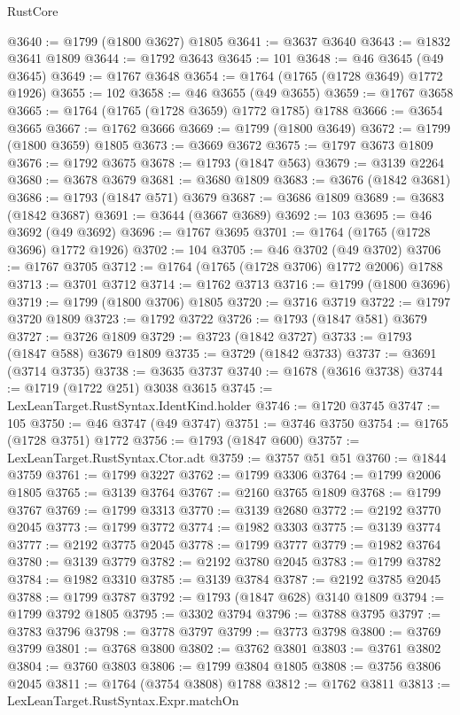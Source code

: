 \begin{lexlean}{RustCore}
\begin{coremodule}
@3640 := @1799 (@1800 @3627) @1805
@3641 := @3637 @3640
@3643 := @1832 @3641 @1809
@3644 := @1792 @3643
@3645 := 101
@3648 := @46 @3645 (@49 @3645)
@3649 := @1767 @3648
@3654 := @1764 (@1765 (@1728 @3649) @1772 @1926)
@3655 := 102
@3658 := @46 @3655 (@49 @3655)
@3659 := @1767 @3658
@3665 := @1764 (@1765 (@1728 @3659) @1772 @1785) @1788
@3666 := @3654 @3665
@3667 := @1762 @3666
@3669 := @1799 (@1800 @3649)
@3672 := @1799 (@1800 @3659) @1805
@3673 := @3669 @3672
@3675 := @1797 @3673 @1809
@3676 := @1792 @3675
@3678 := @1793 (@1847 @563)
@3679 := @3139 @2264
@3680 := @3678 @3679
@3681 := @3680 @1809
@3683 := @3676 (@1842 @3681)
@3686 := @1793 (@1847 @571) @3679
@3687 := @3686 @1809
@3689 := @3683 (@1842 @3687)
@3691 := @3644 (@3667 @3689)
@3692 := 103
@3695 := @46 @3692 (@49 @3692)
@3696 := @1767 @3695
@3701 := @1764 (@1765 (@1728 @3696) @1772 @1926)
@3702 := 104
@3705 := @46 @3702 (@49 @3702)
@3706 := @1767 @3705
@3712 := @1764 (@1765 (@1728 @3706) @1772 @2006) @1788
@3713 := @3701 @3712
@3714 := @1762 @3713
@3716 := @1799 (@1800 @3696)
@3719 := @1799 (@1800 @3706) @1805
@3720 := @3716 @3719
@3722 := @1797 @3720 @1809
@3723 := @1792 @3722
@3726 := @1793 (@1847 @581) @3679
@3727 := @3726 @1809
@3729 := @3723 (@1842 @3727)
@3733 := @1793 (@1847 @588) @3679 @1809
@3735 := @3729 (@1842 @3733)
@3737 := @3691 (@3714 @3735)
@3738 := @3635 @3737
@3740 := @1678 (@3616 @3738)
@3744 := @1719 (@1722 @251) @3038 @3615
@3745 := LexLeanTarget.RustSyntax.IdentKind.holder
@3746 := @1720 @3745
@3747 := 105
@3750 := @46 @3747 (@49 @3747)
@3751 := @3746 @3750
@3754 := @1765 (@1728 @3751) @1772
@3756 := @1793 (@1847 @600)
@3757 := LexLeanTarget.RustSyntax.Ctor.adt
@3759 := @3757 @51 @51
@3760 := @1844 @3759
@3761 := @1799 @3227
@3762 := @1799 @3306
@3764 := @1799 @2006 @1805
@3765 := @3139 @3764
@3767 := @2160 @3765 @1809
@3768 := @1799 @3767
@3769 := @1799 @3313
@3770 := @3139 @2680
@3772 := @2192 @3770 @2045
@3773 := @1799 @3772
@3774 := @1982 @3303
@3775 := @3139 @3774
@3777 := @2192 @3775 @2045
@3778 := @1799 @3777
@3779 := @1982 @3764
@3780 := @3139 @3779
@3782 := @2192 @3780 @2045
@3783 := @1799 @3782
@3784 := @1982 @3310
@3785 := @3139 @3784
@3787 := @2192 @3785 @2045
@3788 := @1799 @3787
@3792 := @1793 (@1847 @628) @3140 @1809
@3794 := @1799 @3792 @1805
@3795 := @3302 @3794
@3796 := @3788 @3795
@3797 := @3783 @3796
@3798 := @3778 @3797
@3799 := @3773 @3798
@3800 := @3769 @3799
@3801 := @3768 @3800
@3802 := @3762 @3801
@3803 := @3761 @3802
@3804 := @3760 @3803
@3806 := @1799 @3804 @1805
@3808 := @3756 @3806 @2045
@3811 := @1764 (@3754 @3808) @1788
@3812 := @1762 @3811
@3813 := LexLeanTarget.RustSyntax.Expr.matchOn

\end{coremodule}
\end{lexlean}
